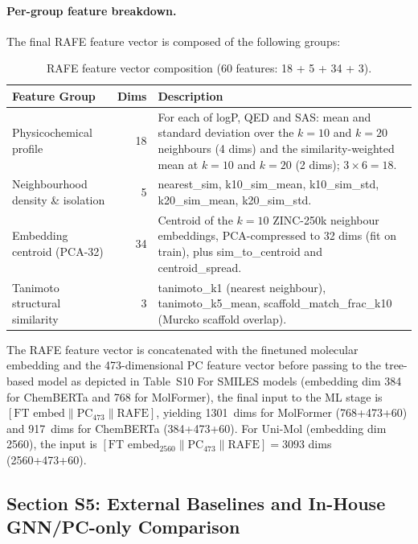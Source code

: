 \documentclass[9pt,a4paper]{article}
\begin{document}
\paragraph{Per-group feature breakdown.}
The final RAFE feature vector is composed of the following groups:

\begin{table}[h]
\centering
\caption{RAFE feature vector composition (60 features: 18 + 5 + 34 + 3).}
\label{tab:s4_rafe_features}
\begin{tabular}{lrp{8cm}}
\toprule
Feature Group & Dims & Description \\
\midrule
Physicochemical profile & 18 &
  For each of logP, QED and SAS: mean and standard deviation over the $k{=}10$ and $k{=}20$ neighbours (4 dims) and the similarity-weighted mean at $k{=}10$ and $k{=}20$ (2 dims); $3\times6=18$. \\
Neighbourhood density \& isolation & 5 &
  nearest\_sim, k10\_sim\_mean, k10\_sim\_std, k20\_sim\_mean, k20\_sim\_std. \\
Embedding centroid (PCA-32) & 34 &
  Centroid of the $k{=}10$ ZINC-250k neighbour embeddings, PCA-compressed to
  32 dims (fit on train), plus sim\_to\_centroid and centroid\_spread. \\
Tanimoto structural similarity & 3 &
  tanimoto\_k1 (nearest neighbour), tanimoto\_k5\_mean,
  scaffold\_match\_frac\_k10 (Murcko scaffold overlap). \\
\bottomrule
\end{tabular}
\end{table}
The RAFE feature vector is concatenated with the finetuned molecular embedding and the 473-dimensional PC feature vector before passing to the tree-based model as depicted in Table~S10
For SMILES models (embedding dim 384 for ChemBERTa and 768 for MolFormer), the final input to the ML stage is
$[\text{FT embed} \| \text{PC}_{473} \| \text{RAFE}]$, yielding 1301~dims for
MolFormer (768+473+60) and 917~dims for ChemBERTa (384+473+60).
For Uni-Mol (embedding dim 2560), the input is
$[\text{FT embed}_{2560} \| \text{PC}_{473} \| \text{RAFE}] = 3093$ dims (2560+473+60).

\subsection*{Section S5: External Baselines and In-House GNN/PC-only Comparison}
\end{document}
